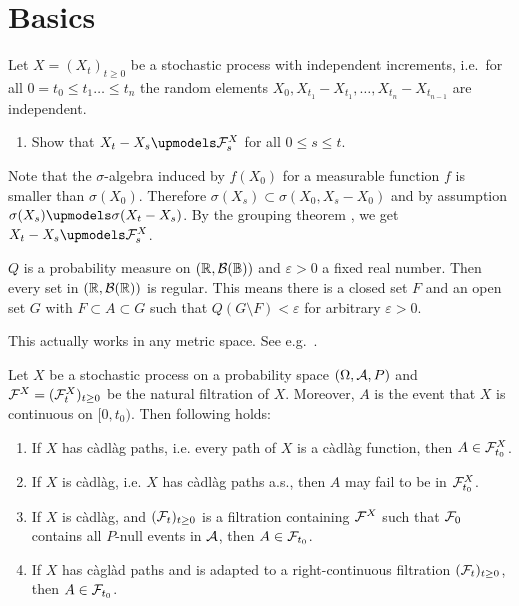 
\section{Basics}

 Let $X = (X_t)_{t\geq 0}$ be
a stochastic process with independent increments, i.e.\ for all $0=t_{0}\leq t_1
\dots \leq t_n$ the random elements $X_0, X_{t_1}-X_{t_1},\dots
,X_{t_n}-X_{t_{n-1}}$ are independent.
\begin{enumerate}
    \item Show that $X_t -X_s \upmodels \cF_{s}^{X}$ for all $0\leq s\leq t$. 
\end{enumerate}

\solution Note that the $\sigma$-algebra induced by $f(X_0)$ for a
measurable function $f$ is smaller than $\sigma(X_0)$. Therefore $\sigma(X_s)
\subset \sigma(X_0, X_s-X_0)$ and by assumption $\sigma(X_s) \upmodels
\sigma(X_t-X_s)$. By the grouping theorem \cite[p. 51]{Kallenberg}, we get
$X_{t}-X_{s}\upmodels \cF_s^{X}$. 


 $Q$ is a probability
measure on $(\mathbb R, \mathcal B(\mathbb B))$ and $\varepsilon>0$ a fixed real number. Then
every set in $(\mathbb R, \mathcal B(\mathbb R))$ is regular. This means there is a closed set $F$
and an open set $G$ with $F\subset A \subset G$ such that $Q(G\setminus
F)<\varepsilon$ for arbitrary $\varepsilon>0$. 

\solution This actually works in any metric space. See e.g.\ \cite{Billingsley2009}.


 Let $X$ be a stochastic process
on a probability space $(\Omega, \mathcal A, P)$ and $\mathcal F^{X}=(\mathcal F^{X}_{t})_{t\geq 0}$
be the natural filtration of $X$. Moreover, $A$ is the event that $X$ is
continuous on $[0, t_0)$. Then following holds:
\begin{enumerate}
    \item If $X$ has c\`adl\`ag paths, i.e. every path of $X$ is a c\`adl\`ag
        function, then $A\in \mathcal F^{X}_{t_0}$. 

    \item If $X$ is c\`adl\`ag, i.e. $X$ has c\`adl\`ag paths a.s., then $A$
        may fail to be in $\mathcal F^{X}_{t_0}$.

    \item If $X$ is c\`adl\`ag, and $(\mathcal F_{t})_{t\geq 0}$ is a filtration
        containing $\mathcal F^{X}$ such that $\mathcal F_{0}$ contains all $P$-null events
        in $\mathcal A$, then $A\in \mathcal F_{t_0}$.

    \item If $X$ has c\`agl\`ad paths and is adapted to a right-continuous
        filtration $(\mathcal F_{t})_{t\geq 0}$, then $A\in \mathcal F_{t_{0}}$. 
\end{enumerate}

